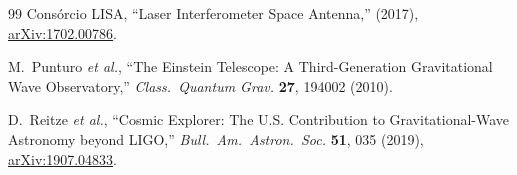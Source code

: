 \documentclass[12pt,a4paper,twocolumn]{article}
\begin{document}
\begin{thebibliography}{99}
Consórcio LISA,
``Laser Interferometer Space Antenna,''
(2017),
\href{https://arxiv.org/abs/1702.00786}{arXiv:1702.00786}.

M.~Punturo \textit{et al.},
``The Einstein Telescope: A Third-Generation Gravitational Wave Observatory,''
\textit{Class.~Quantum Grav.} \textbf{27}, 194002 (2010).

D.~Reitze \textit{et al.},
``Cosmic Explorer: The U.S. Contribution to Gravitational-Wave Astronomy beyond LIGO,''
\textit{Bull.~Am.~Astron.~Soc.} \textbf{51}, 035 (2019),
\href{https://arxiv.org/abs/1907.04833}{arXiv:1907.04833}.

\end{thebibliography}
\end{document}
